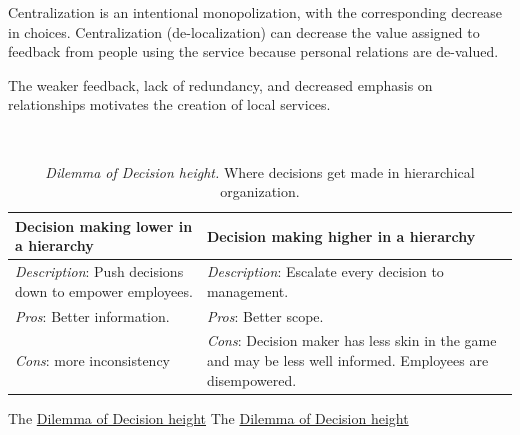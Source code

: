 Centralization is an intentional monopolization, with the corresponding decrease in choices. 
Centralization (de-localization) can decrease the value assigned to feedback from people using the service because personal relations are de-valued. 

The weaker feedback, lack of redundancy, and decreased emphasis on relationships motivates the creation of local services. 

\ \\

\begin{center}
\begin{table}[H] %
\begin{tabular}{ | m{\dilemmatablewidth}| m{\dilemmatablewidth} | } 
  \hline
  \textbf{Decision making lower in a hierarchy} &
  \textbf{Decision making higher in a hierarchy} \\
  \hline
  \textit{Description}: Push decisions down to empower employees. &
  \textit{Description}: Escalate every decision to management. \\  
  \hline
  \textit{Pros}: Better information. &
  \textit{Pros}: Better scope. \\
  \hline
  \textit{Cons}: more inconsistency & 
  \textit{Cons}: Decision maker has less skin in the game and may be less well informed. Employees are disempowered. \\
  \hline
\end{tabular}
\caption{
\textit{Dilemma of Decision height.}
Where decisions get made in hierarchical organization.
}
\label{table:decisions-low-vs-high}
\end{table}
\end{center}


The \href{table:decisions-low-vs-high}{Dilemma of Decision height}
The \href{table:decisions-low-vs-high}{Dilemma of Decision height}


